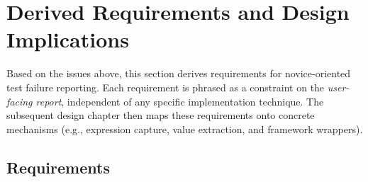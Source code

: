 \section{Derived Requirements and Design Implications} %
  \label{Derived Requirements and Design Implications} %


\improve


\begin{justify}
Based on the issues above, this section derives requirements for novice-oriented test failure
reporting. Each requirement is phrased as a constraint on the \emph{user-facing report}, independent
of any specific implementation technique. The subsequent design chapter then maps these requirements
onto concrete mechanisms (e.g., expression capture, value extraction, and framework wrappers).
\end{justify}


\subsection{Requirements} %
     \label{Requirements} %


